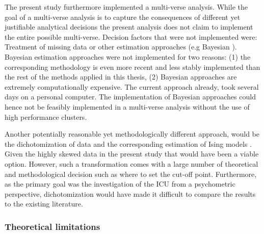  The present study furthermore implemented a multi-verse analysis. 
 While the goal of a multi-verse analysis is to capture the consequences of different yet justifiable analytical decisions the present analysis does not claim to implement the entire possible multi-verse.
 Decision factors that were not implemented were: Treatment of missing data or other estimation approaches (e.g Bayesian \parencite{williams_bggm_2019}).
 Bayesian estimation approaches were not implemented for two reasons: (1) the corresponding methodology is even more recent and less stably implemented than the rest of the methods applied in this thesis, 
 (2) Bayesian approaches are extremely computationally expensive. The current approach already, took several days on a personal computer. 
 The implementation of Bayesian approaches could hence not be feasibly implemented in a multi-verse analysis without the use of high performance clusters.
 
 Another potentially reasonable yet methodologically different approach, would be the dichotomization of data and the corresponding estimation of Ising models \parencite{epskamp_tutorial_2018}.
 Given the highly skewed data in the present study that would have been a viable option.
 However, such a transformation comes with a large number of theoretical and methodological decision such as where to set the cut-off point.
 Furthermore, as the primary goal was the investigation of the ICU from a psychometric perspective, dichotomization would have made it difficult to compare the results to the existing literature. 
 
 
\subsubsection{Theoretical limitations}
 
